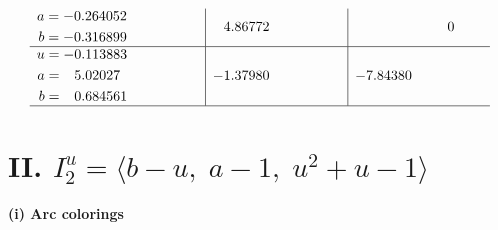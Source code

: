 \documentclass[1p]{elsarticle_modified}
\theoremstyle{definition}
\begin{document}
$$\begin{array}{c|c|c}
\begin{aligned}
a &= -0.264052\phantom{ +0.000000I} \\
b &= -0.316899\phantom{ +0.000000I}\end{aligned}
 & \phantom{-}4.86772\phantom{ +0.000000I} & \phantom{-0.000000 } 0 \\ \hline\begin{aligned}
u &= -0.113883\phantom{ +0.000000I} \\
a &= \phantom{-}5.02027\phantom{ +0.000000I} \\
b &= \phantom{-}0.684561\phantom{ +0.000000I}\end{aligned}
 & -1.37980\phantom{ +0.000000I} & -7.84380\phantom{ +0.000000I}\\
 \hline 
 \end{array}$$\newpage\newpage\renewcommand{\arraystretch}{1}
\centering \section*{II. $I^u_{2}= \langle b- u,\;a-1,\;u^2+u-1 \rangle$}
\flushleft \textbf{(i) Arc colorings}\\
\end{document}
